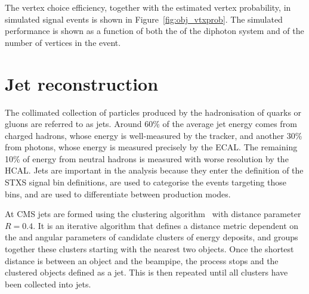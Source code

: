 The vertex choice efficiency, together with the estimated vertex probability,
in simulated \Hgg signal events is shown in Figure~\ref{fig:obj_vtxprob}.
The simulated performance is shown as a function of both the \pt of the diphoton
system and of the number of vertices in the event.

\section{Jet reconstruction}

The collimated collection of particles produced by the hadronisation of quarks or gluons are referred to as jets.
Around 60\% of the average jet energy comes from charged hadrons, whose energy is well-measured by the tracker,
and another 30\% from photons, whose energy is measured precisely by the ECAL.
The remaining 10\% of energy from neutral hadrons is measured with worse resolution by the HCAL.
Jets are important in the \Hgg analysis because they enter the definition of the STXS signal bin definitions, 
are used to categorise the events targeting those bins, 
and are used to differentiate between production modes.

At CMS jets are formed using the \akt clustering algorithm~\cite{AntiKt} with distance parameter $R=0.4$. %
It is an iterative algorithm that defines a distance metric dependent on the \pt and angular parameters of candidate clusters of energy deposits, 
and groups together these clusters starting with the nearest two objects.
Once the shortest distance is between an object and the beampipe, the process stops and the clustered objects defined as a jet.
This is then repeated until all clusters have been collected into jets.

